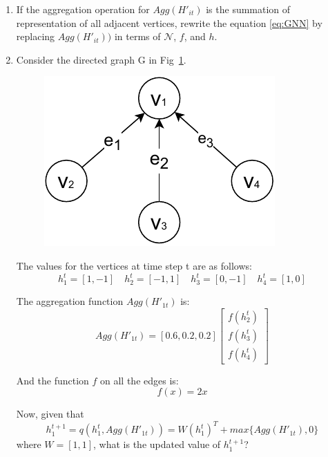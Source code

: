 \begin{enumerate}
    \item 
    
    If the aggregation operation for $Agg(H'_{it})$ is the summation of representation of all adjacent vertices, rewrite the equation \ref{eq:GNN} by replacing $Agg(H'_{it}))$ in terms of $\mathcal{N}$, $f$, and $h$.
    
    \item Consider the directed graph G in Fig~\ref{fig: graph}.
    \begin{figure}[h] 
        \includegraphics[scale = 0.8]{assets/graph.pdf}
        \centering
        \caption{}\label{fig: graph}
    \end{figure}
    The values for the vertices at time step t are as follows:
    \begin{equation}
        h_1^{t} = [1, -1] \quad h_2^{t} = [-1, 1] \quad h_3^{t} = [0, -1]\quad h_4^{t} = [1, 0]
    \end{equation}
    
    The aggregation function $Agg(H'_{1t})$ is:
    \begin{equation}
        Agg(H'_{1t}) = [0.6, 0.2, 0.2] \begin{bmatrix}
           f(h_{2}^{t}) \\
           f(h_{3}^{t}) \\
           f(h_{4}^{t})
         \end{bmatrix}
    \end{equation}
    
   And the function $f$ on all the edges is:
    \begin{equation}
        f(x) = 2x
    \end{equation}
    
    Now, given that
    \begin{equation}
        h_1^{t+1} = q(h_1^{t}, Agg(H'_{1t})) = W(h_1^{t})^{T} + max\{Agg(H'_{1t}),0\}
    \end{equation}where $W = [1,1]$, what is the updated value of $h_1^{t+1}$?
\end{enumerate}


